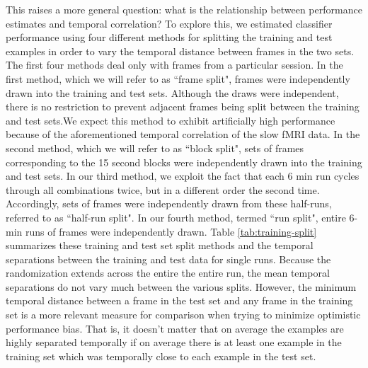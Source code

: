 \documentclass[preprint,5p,authoryear]{elsarticle}
\begin{document}
This raises a more general question: what is the relationship between performance estimates and temporal correlation?
To explore this, we estimated classifier performance using four different methods for splitting the training and test examples in order to vary the temporal distance between frames in the two sets. 
The first four methods deal only with frames from a particular session.
In the first method, which we will refer to as  ``frame split", frames were independently drawn into the training and test sets. 
Although the draws were independent, there is no restriction to prevent adjacent frames being split between the training and test sets.We expect this method to exhibit artificially high performance because of the aforementioned temporal correlation of the slow fMRI data.
In the second method, which we will refer to as ``block split", sets of frames corresponding to the 15 second blocks were independently drawn into the training and test sets.
In our third method, we exploit the fact that each 6 min run cycles through all combinations twice, but in a different order the second time.
Accordingly, sets of frames were independently drawn from these half-runs, referred to as ``half-run split". 
In our fourth method, termed ``run split", entire 6-min runs of frames were independently drawn. 
Table \ref{tab:training-split} summarizes these training and test set split methods and the temporal separations between the training and test data for single runs. 
Because the randomization extends across the entire the entire run, the mean temporal separations do not vary much between the various splits. 
However, the minimum temporal distance between a frame in the test set and any frame in the training set is a more relevant measure for comparison when trying to minimize optimistic performance bias.
That is, it doesn't matter that on average the examples are highly separated temporally if on average there is at least one example in the training set which was temporally close to each example in the test set.

\end{document}
